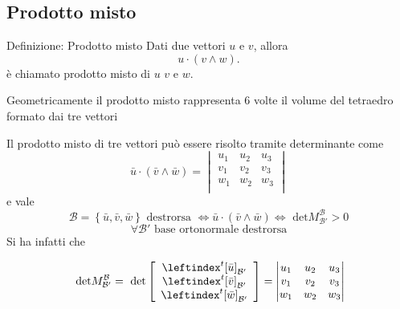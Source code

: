 \documentclass[x11names]{article}
\begin{document}
\subsection{Prodotto misto}

\begin{center}
\colorbox{myblue}{\begin{minipage}{5.75in}
\begin{blues}{Definizione: Prodotto misto}
Dati due vettori $u$ e $v$, allora
\[
u \cdot \left(v \wedge w\right)
.\] 
è chiamato prodotto misto di $u$ $v$ e  $w$. 

Geometricamente il prodotto misto rappresenta $6$ volte il volume del tetraedro formato dai tre vettori
\end{blues}
\end{minipage}}        
\end{center}

\noindent
Il prodotto misto di tre vettori può essere risolto tramite determinante come 
\[
\bar{u} \cdot \left(\bar{v} \wedge \bar{w}\right) = \begin{vmatrix}
	u_{1} & u_{2} & u_{3} \\
	v_{1} & v_{2} & v_{3} \\
	w_{1} & w_{2} & w_{3} \\
\end{vmatrix}
\]
e vale 
\[
\mathcal{B} = \left\{\bar{u},\bar{v},\bar{w}\right\} \text{ destrorsa }\Longleftrightarrow \bar{u} \cdot \left(\bar{v} \wedge \bar{w}\right) \Longleftrightarrow \text{ det}M^{\mathcal{B}}_{\mathcal{B}'} > 0
\]
\[
\forall \mathcal{B}' \text{ base ortonormale destrorsa}
\]
Si ha infatti che 

\[
 \text{ det}M^{\mathcal{B}}_{\mathcal{B}'} = \text{ det}\left[\begin{array}{c}
 	\leftindex^{t}{[\bar{u}]}_{\mathcal{B}'} \\
 	\leftindex^{t}{[\bar{v}]}_{\mathcal{B}'} \\
 	\leftindex^{t}{[\bar{w}]}_{\mathcal{B}'} \\
 \end{array}\right] = \begin{vmatrix}
 u_{1} & u_{2} & u_{3} \\
 v_{1} & v_{2} & v_{3} \\
 w_{1} & w_{2} & w_{3} \\
 \end{vmatrix}
\]



\end{document}
